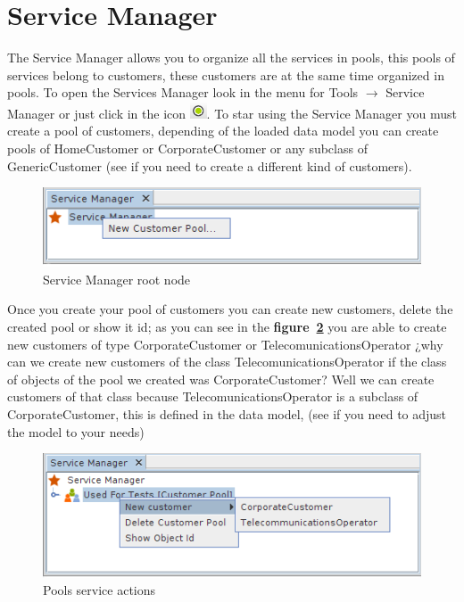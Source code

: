 \documentclass[a4paper]{article}
\begin{document}
	\newpage
	\section{Service Manager} \label{sec:service_manager}
	
	The Service Manager allows you to organize all the services in pools, this pools of services belong to customers, these customers are at the same time organized in pools. To open the Services Manager look in the menu for Tools $\rightarrow$ Service Manager or just click in the icon \includegraphics[width=0.5cm]{img/icon_service_manager.png}.   
	To star using the Service Manager you must create a pool of customers, depending of the loaded data model you can create pools of HomeCustomer or CorporateCustomer or any subclass of GenericCustomer (see \textbf{} if you need to create a different kind of customers).  

	\begin{figure}[h!]
		\centering
		\includegraphics[width=0.6\linewidth]{img/sm_root_node.png}
		\caption{Service Manager root node}
		\label{fig:sm_root_node}
	\end{figure}

	Once you create your pool of customers you can create new customers, delete the created pool or show it id; as you can see in the \textbf{figure~\ref{fig:sm_pools_service_actions}} you are able to create new customers of type CorporateCustomer or TelecomunicationsOperator ¿why can we create new customers of the class TelecomunicationsOperator if the class of objects of the pool we created was CorporateCustomer? Well we can create customers of that class because TelecomunicationsOperator is a subclass of CorporateCustomer, this is defined in the data model, (see \textbf{} if you need to adjust the model to your needs)
	
	\begin{figure}[h!]
		\centering
		\includegraphics[width=0.6\linewidth]{img/sm_pools_service_actions.png}
		\caption{Pools service actions}
		\label{fig:sm_pools_service_actions}
	\end{figure}
    
\end{document}
